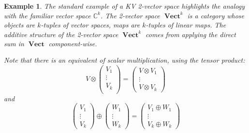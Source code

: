 \documentclass[10pt]{amsart}
\numberwithin{theorem}{subsection}
\newtheorem{varexample}[theorem]{Example}
\newenvironment{example}{\begin{varexample}\em}{\em\end{varexample}}
\newcommand{\ra}{\mathop{\rightarrow}}
\newcommand{\opname}[1]{\operatorname{#1}}
\newcommand{\catname}[1]{\boldsymbol{\opname{{#1}}}}
\newcommand{\V}{\catname{Vect}}
\begin{document}

\begin{example}The standard example \cite{KV} of a KV 2-vector space
highlights the analogy with the familiar vector space $\mathbb{C}^k$.
The 2-vector space $\V^k$ is a category whose objects are $k$-tuples
of vector spaces, maps are $k$-tuples of linear maps.  The
\textit{additive} structure of the 2-vector space $\V^k$ comes from
applying the direct sum in $\V$ component-wise.

Note that there is an equivalent of \textit{scalar multiplication},
using the tensor product:
\begin{equation}
V \otimes 
\begin{pmatrix}
  V_1 \\ 
  \vdots \\
  V_k \\
\end{pmatrix}
=
\begin{pmatrix}
  V \otimes V_1 \\
  \vdots \\
  V \otimes V_k
\end{pmatrix}
\end{equation}
and
\begin{equation}
\begin{pmatrix}
  V_1 \\ 
  \vdots \\
  V_k
\end{pmatrix}
 \oplus 
\begin{pmatrix}
  W_1 \\
  \vdots \\
  W_k
\end{pmatrix}
= 
\begin{pmatrix}
  V_1 \oplus W_1 \\
  \vdots \\
  V_k \oplus W_k
\end{pmatrix}
\end{equation}


\end{example}
\end{document}
